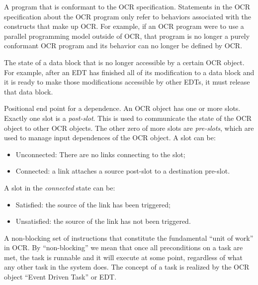 \glossarydefstart
A program that is conformant to the OCR specification. Statements in
the OCR specification about the OCR program only refer to behaviors
associated with the constructs that make up OCR. For example, if an
OCR program were to use a parallel programming model outside of OCR,
that program is no longer a purely conformant OCR program and its
behavior can no longer be defined by OCR.
\glossarydefend

\glossarydefstart
The state of a data block that is no longer accessible by a certain OCR
object. For example, after an EDT has finished all of its
modification to a data block and it is ready to make those
modifications accessible by other EDTs, it must release that data
block.
\glossarydefend

\glossarydefstart
Positional end point for a dependence. An OCR object has one or more
slots. Exactly one slot is a \emph{post-slot}. This is used to
communicate the state of the OCR object to other OCR objects. The
other zero of more slots are \emph{pre-slots}, which are used to manage
input dependences of the OCR object. A slot can be:
\begin{itemize}
\item Unconnected: There are no links connecting to the slot;
\item Connected: a link attaches a source post-slot to a destination pre-slot.
\end{itemize}
A slot in the \emph{connected} state can be:
\begin{itemize}
\item Satisfied: the source of the link has been triggered;
\item Unsatisfied: the source of the link has not been triggered.
\end{itemize}
\glossarydefend

\glossarydefstart
A non-blocking set of instructions that constitute the fundamental
``unit of work'' in OCR.  By ``non-blocking'' we mean that once all
preconditions on a task are met, the task is runnable
and it will execute at some point,
regardless of what any other task in the system does. The concept of
a task is realized by the OCR object ``Event Driven Task'' or EDT.
\glossarydefend

